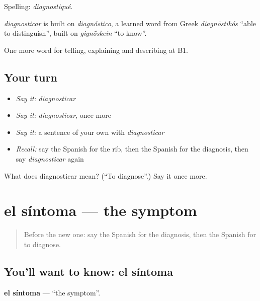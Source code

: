 Spelling: \emph{diagnostiqué}.

\begin{cousinweb}
\emph{diagnosticar} is built on \emph{diagnóstico}, a learned word from Greek \emph{diagnōstikós} \textquotedblleft{}able to distinguish\textquotedblright{}, built on \emph{gign\'{\={o}}skein} \textquotedblleft{}to know\textquotedblright{}.
\end{cousinweb}

\begin{grammarlens}[title={What you've built}]
One more word for telling, explaining and describing at B1.
\end{grammarlens}

\subsection*{Your turn}
\begin{itemize}
\raggedright
  \item \emph{Say it:} \emph{diagnosticar}
  \item \emph{Say it:} \emph{diagnosticar}, once more
  \item \emph{Say it:} a sentence of your own with \emph{diagnosticar}
  \item \emph{Recall:} say the Spanish for the rib, then the Spanish for the diagnosis, then say \emph{diagnosticar} again
\end{itemize}

\begin{tcolorbox}[breakable,colback=teal!4,colframe=teal!35!black,title={Before you move on}]
What does diagnosticar mean? (\textquotedblleft{}To diagnose\textquotedblright{}.) Say it once more.
\end{tcolorbox}
\section[el síntoma]{el síntoma — the symptom}

\label{lesson:ES-C738-sintoma}



\begin{quote}
Before the new one: say the Spanish for the diagnosis, then the Spanish for to diagnose.
\end{quote}

\subsection*{You'll want to know: el síntoma}
\textbf{el síntoma} — \textquotedblleft{}the symptom\textquotedblright{}.

